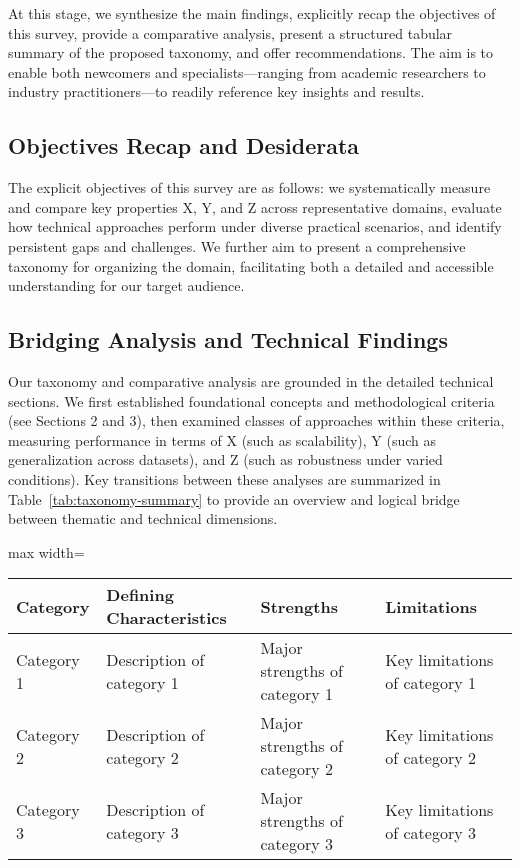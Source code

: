 \documentclass[sigconf]{acmart}
\begin{document}
At this stage, we synthesize the main findings, explicitly recap the objectives of this survey, provide a comparative analysis, present a structured tabular summary of the proposed taxonomy, and offer recommendations. The aim is to enable both newcomers and specialists—ranging from academic researchers to industry practitioners—to readily reference key insights and results.

\subsection{Objectives Recap and Desiderata}
The explicit objectives of this survey are as follows: we systematically measure and compare key properties X, Y, and Z across representative domains, evaluate how technical approaches perform under diverse practical scenarios, and identify persistent gaps and challenges. We further aim to present a comprehensive taxonomy for organizing the domain, facilitating both a detailed and accessible understanding for our target audience.

\subsection{Bridging Analysis and Technical Findings}
Our taxonomy and comparative analysis are grounded in the detailed technical sections. We first established foundational concepts and methodological criteria (see Sections 2 and 3), then examined classes of approaches within these criteria, measuring performance in terms of X (such as scalability), Y (such as generalization across datasets), and Z (such as robustness under varied conditions). Key transitions between these analyses are summarized in Table~\ref{tab:taxonomy-summary} to provide an overview and logical bridge between thematic and technical dimensions.

\begin{table*}[htbp]
\centering
\caption{Summary of Proposed Taxonomy with Key Properties Across Categories}
\label{tab:taxonomy-summary}
\begin{adjustbox}{max width=\textwidth}
\begin{tabular}{@{}llll@{}}
\toprule
Category & Defining Characteristics & Strengths & Limitations \\
\midrule
Category 1 & Description of category 1 & Major strengths of category 1 & Key limitations of category 1 \\
Category 2 & Description of category 2 & Major strengths of category 2 & Key limitations of category 2 \\
Category 3 & Description of category 3 & Major strengths of category 3 & Key limitations of category 3 \\
\bottomrule
\end{tabular}
\end{adjustbox}
\end{table*}
\end{document}
